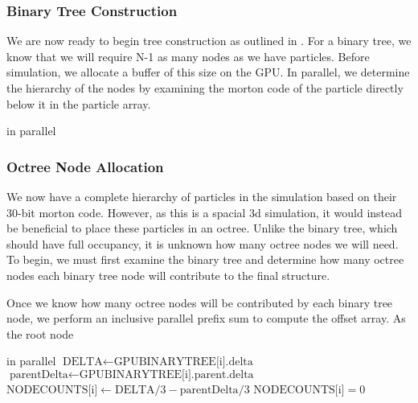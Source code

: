 \documentclass{thesis}
\begin{document}
\begin{algorithmic}
    \EndFor
\end{algorithmic}
\subsubsection{Binary Tree Construction}
We are now ready to begin tree construction as outlined in \cite{Karas:2012}. For a binary tree, we know that we will require N-1 as many nodes as we have particles. Before simulation, we allocate a buffer of this size on the GPU. In parallel, we determine the hierarchy of the nodes by examining the morton code of the particle directly below it in the particle array.

\begin{algorithmic}
     in parallel
    \EndFor
\end{algorithmic}
\subsubsection{Octree Node Allocation}
We now have a complete hierarchy of particles in the simulation based on their 30-bit morton code. However, as this is a spacial 3d simulation, it would instead be beneficial to place these particles in an octree. Unlike the binary tree, which should have full occupancy, it is unknown how many octree nodes we will need. To begin, we must first examine the binary tree and determine how many octree nodes each binary tree node will contribute to the final structure.

Once we know how many octree nodes will be contributed by each binary tree node, we perform an inclusive parallel prefix sum to compute the offset array. As the root node 

\begin{algorithmic}
     in parallel
            \State $\text{DELTA} \gets \text{GPUBINARYTREE[i].delta}$
            \State $\text{parentDelta} \gets \text{GPUBINARYTREE[i].parent.delta}$
            \State $\text{NODECOUNTS[i]} \gets \text{DELTA}/3 - \text{parentDelta}/3$
        \Else
            \State $\text{NODECOUNTS[i]} = 0$
        \EndIf
    \EndFor
\end{algorithmic}
\end{document}
